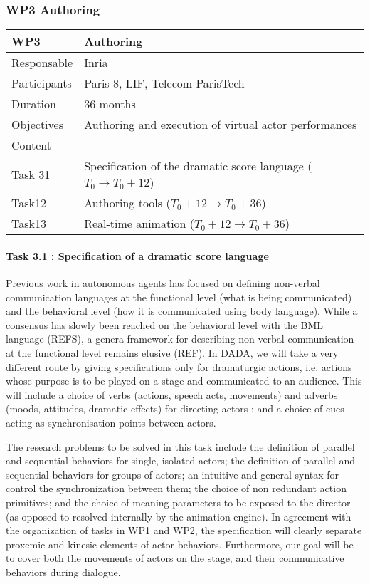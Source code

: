 \subsubsection{WP3 Authoring}


\begin{center}
\begin{tabular}{|l|l|}\hline
WP3 &  Authoring \\\hline
Responsable &  Inria  \\\hline
Participants &  Paris 8, LIF, Telecom ParisTech\\\hline
Duration  &   36 months \\\hline
Objectives &  Authoring and execution of virtual actor performances  \\\hline
Content &  \\\hline
Task 31 & Specification of the dramatic score language  ($T_0 \rightarrow  T_0+12$)  \\\hline
Task12 &  Authoring tools  ($T_0+12 \rightarrow  T_0+36$)  \\\hline
Task13 &  Real-time animation   ($T_0+12 \rightarrow  T_0+36$)  \\\hline
\end{tabular}
\end{center}


\paragraph{Task 3.1 : Specification of a dramatic score language}

Previous work in autonomous agents has focused on defining non-verbal communication languages at the functional level (what is being communicated) and the behavioral level (how it is communicated using body language). While a consensus has slowly been reached on the behavioral level with the BML language (REFS), a genera framework for describing non-verbal communication at the functional level remains elusive (REF). In DADA, we will take a very different route by giving specifications only for dramaturgic actions,
i.e. actions whose purpose is to be played on a stage and communicated to an audience. This will include a choice of verbs (actions, speech acts, movements) and adverbs (moods, attitudes, dramatic effects)  for directing actors ; and a choice of cues acting as synchronisation points between actors.

The research problems to be solved in this task include the definition of parallel and sequential behaviors for single, isolated actors; the definition of parallel and sequential behaviors for groups of actors; an intuitive and general  syntax for control the synchronization between them; the choice of non redundant action primitives; and the choice of meaning parameters to be exposed to the director (as opposed to resolved internally by the animation engine). In agreement with the organization of tasks in WP1 and WP2, the specification will clearly separate proxemic and kinesic elements of actor behaviors. Furthermore,  our goal will be to cover both the movements of actors on the stage, and their communicative behaviors during dialogue. 

